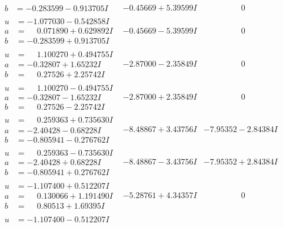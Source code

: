 \documentclass[1p]{elsarticle_modified}
\theoremstyle{definition}
\begin{document}
$$\begin{array}{c|c|c}
\begin{aligned}
b &= -0.283599 - 0.913705 I\end{aligned}
 & -0.45669 + 5.39599 I & \phantom{-0.000000 } 0 \\ \hline\begin{aligned}
u &= -1.077030 - 0.542858 I \\
a &= \phantom{-}0.071890 + 0.629892 I \\
b &= -0.283599 + 0.913705 I\end{aligned}
 & -0.45669 - 5.39599 I & \phantom{-0.000000 } 0 \\ \hline\begin{aligned}
u &= \phantom{-}1.100270 + 0.494755 I \\
a &= -0.32807 + 1.65232 I \\
b &= \phantom{-}0.27526 + 2.25742 I\end{aligned}
 & -2.87000 - 2.35849 I & \phantom{-0.000000 } 0 \\ \hline\begin{aligned}
u &= \phantom{-}1.100270 - 0.494755 I \\
a &= -0.32807 - 1.65232 I \\
b &= \phantom{-}0.27526 - 2.25742 I\end{aligned}
 & -2.87000 + 2.35849 I & \phantom{-0.000000 } 0 \\ \hline\begin{aligned}
u &= \phantom{-}0.259363 + 0.735630 I \\
a &= -2.40428 - 0.68228 I \\
b &= -0.805941 - 0.276762 I\end{aligned}
 & -8.48867 + 3.43756 I & -7.95352 - 2.84384 I \\ \hline\begin{aligned}
u &= \phantom{-}0.259363 - 0.735630 I \\
a &= -2.40428 + 0.68228 I \\
b &= -0.805941 + 0.276762 I\end{aligned}
 & -8.48867 - 3.43756 I & -7.95352 + 2.84384 I \\ \hline\begin{aligned}
u &= -1.107400 + 0.512207 I \\
a &= \phantom{-}0.130066 + 1.191490 I \\
b &= \phantom{-}0.80513 + 1.69395 I\end{aligned}
 & -5.28761 + 4.34357 I & \phantom{-0.000000 } 0 \\ \hline\begin{aligned}
u &= -1.107400 - 0.512207 I \\

\end{aligned}
\end{array}$$
\end{document}
